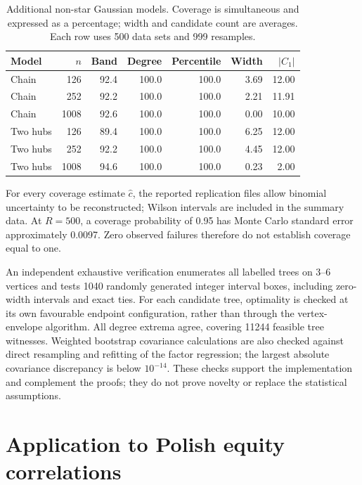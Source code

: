 \documentclass[pdflatex,sn-mathphys-ay]{sn-jnl}
\theoremstyle{thmstyleone}
\theoremstyle{thmstyletwo}
\begin{document}
\begin{table}[t]
\caption{Additional non-star Gaussian models. Coverage is simultaneous and expressed as a percentage; width and candidate count are averages. Each row uses 500 data sets and 999 resamples.}\label{tab:shapes}
\centering\small
\begin{tabular}{@{}lrrrrrr@{}}\toprule
Model & $n$ & Band & Degree & Percentile & Width & $|C_1|$\\\midrule
Chain & 126 & 92.4 & 100.0 & 100.0 & 3.69 & 12.00\\
Chain & 252 & 92.2 & 100.0 & 100.0 & 2.21 & 11.91\\
Chain & 1008 & 92.6 & 100.0 & 100.0 & 0.00 & 10.00\\
Two hubs & 126 & 89.4 & 100.0 & 100.0 & 6.25 & 12.00\\
Two hubs & 252 & 92.2 & 100.0 & 100.0 & 4.45 & 12.00\\
Two hubs & 1008 & 94.6 & 100.0 & 100.0 & 0.23 & 2.00\\
\bottomrule\end{tabular}
\end{table}

For every coverage estimate $\widehat c$, the reported replication files allow binomial uncertainty to be reconstructed; Wilson intervals are included in the summary data. At $R=500$, a coverage probability of 0.95 has Monte Carlo standard error approximately 0.0097. Zero observed failures therefore do not establish coverage equal to one.

An independent exhaustive verification enumerates all labelled trees on 3--6 vertices and tests 1040 randomly generated integer interval boxes, including zero-width intervals and exact ties. For each candidate tree, optimality is checked at its own favourable endpoint configuration, rather than through the vertex-envelope algorithm. All degree extrema agree, covering 11244 feasible tree witnesses. Weighted bootstrap covariance calculations are also checked against direct resampling and refitting of the factor regression; the largest absolute covariance discrepancy is below $10^{-14}$. These checks support the implementation and complement the proofs; they do not prove novelty or replace the statistical assumptions.

\section{Application to Polish equity correlations}\label{sec:gpw}
\end{document}
